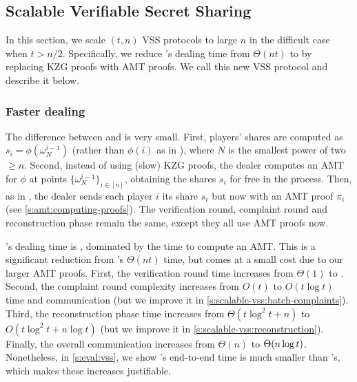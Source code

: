 \subsection{Scalable Verifiable Secret Sharing}
\label{s:scalable-vss}
In this section, we scale $(t,n)$ VSS protocols to large $n$ in the difficult case when $t > n/2$.
Specifically, we reduce \evss's dealing time from $\Theta(nt)$ to \amtDealTime by replacing KZG proofs with AMT proofs.
We call this new VSS protocol \ourvss and describe it below.

\subsubsection{Faster dealing}
\label{s:scalable-vss:overview}
The difference between \ourvss and \evss is very small.
First, players' shares are computed as $s_i = \phi(\omega_N^{i-1})$ (rather than $\phi(i)$ as in \evss), where $N$ is the smallest power of two $\ge n$.
Second, instead of using (slow) KZG proofs, the dealer computes an AMT for $\phi$ at points $\{\omega_N^{i-1}\}_{i\in[n]}$, obtaining the shares $s_i$ for free in the process.
Then, as in \evss, the dealer sends each player $i$ its share $s_i$ but now with an AMT proof $\pi_i$ (see \cref{s:amt:computing-proofs}).
The verification round, complaint round and reconstruction phase remain the same, except they all use AMT proofs now.

\ourvss's dealing time is \amtDealTime, dominated by the time to compute an AMT.
This is a significant reduction from \evss's $\Theta(nt)$ time, but comes at a small cost due to our larger AMT proofs.
First, the verification round time increases from $\Theta(1)$ to \amtOneShareVerifTime.
Second, the complaint round complexity increases from $O(t)$ to $O(t\log{t})$ time and communication (but we improve it in \cref{s:scalable-vss:batch-complaints}).
Third, the reconstruction phase time increases from $\Theta(t\log^2{t} + n)$ to $O(t\log^2{t} + n\log{t})$  (but we improve it in \cref{s:scalable-vss:reconstruction}).
Finally, the overall communication increases from $\Theta(n)$ to $\Theta(n\log{t})$.
Nonetheless, in \cref{s:eval:vss}, we show \ourvss's end-to-end time is much smaller than \evss's, which makes these increases justifiable.

